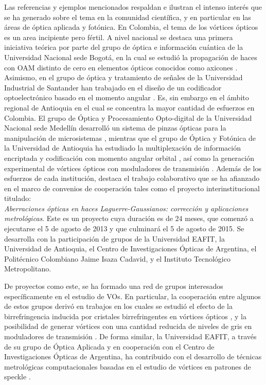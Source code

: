 Las referencias y ejemplos mencionados respaldan e ilustran el
intenso interés que se ha generado sobre el tema en la 
comunidad científica, y en particular en las áreas de óptica
aplicada y fotónica.  En Colombia, el tema de los vórtices ópticos es
un area  incipiente pero fértil. A nivel nacional se destaca una primera
iniciativa teórica por parte del grupo de óptica e información
cuántica de la  Universidad Nacional sede
Bogotá, en la cual se estudió la propagación de haces con OAM distinto de
cero en elementos ópticos conocidos como axicones
. Asimismo, en el grupo de óptica y tratamiento de
señales de la Universidad Industrial de Santander han trabajado en el diseño de un codificador optoelectrónico
basado en el momento angular . Es,
sin embargo en el ámbito regional de Antioquia en el cual se
concentra la mayor cantidad de esfuerzos en Colombia.  El grupo de
Óptica y Procesamiento Opto-digital de la Universidad 
Nacional sede Medellín desarrolló un sistema de pinzas ópticas para la
manipulación de microsistemas , mientras que el grupo de Óptica y Fotónica
de la Universidad de Antioquia ha estudiado la multiplexación de
información encriptada y codificación con momento angular
orbital , así como la generación experimental de
vórtices ópticos con moduladores de transmisión
. Además de los esfuerzos
de cada institución, destaca el trabajo colaborativo que se ha afianzado en el marco de convenios de
cooperación tales como el proyecto interinstitucional titulado:\\
\textit{Aberraciones ópticas en haces Laguerre-Gaussianos: corrección
  y aplicaciones metrológicas}. Este es un proyecto cuya duración es de 24 meses, que
comenzó a ejecutarse el 5 de agosto de 2013 y que culminará el 5 de
agosto de 2015. Se desarrolla con la participación de grupos de la
Universidad EAFIT, la Universidad de Antioquia, el Centro de
Investigaciones Ópticas de Argentina, el Politécnico Colombiano Jaime
Isaza Cadavid, y el Instituto Tecnológico Metropolitano. 

De proyectos como este, se ha formado una red de grupos interesados
específicamente en el estudio de VOs. En particular,
la cooperación entre algunos de estos grupos derivó en trabajos en los
cuales se estudió el efecto de la birrefringencia inducida por
cristales birrefringentes en vórtices ópticos , y la
posibilidad de generar vórtices con una cantidad reducida de niveles
de gris en moduladores de transmisión . De forma
similar, la Universidad EAFIT, a través de su grupo de Óptica Aplicada
y en cooperación con el Centro de Investigaciones Ópticas de
Argentina,  ha contribuido con el desarrollo de técnicas metrológicas
computacionales basadas en el estudio de  vórtices en patrones de
speckle
. 



